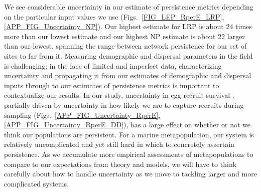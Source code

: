 \documentclass[12pt, oneside]{article}   	%
\begin{document}
We see considerable uncertainty in our estimate of persistence metrics depending on the particular input values we use (Figs.\ \ref{FIG_LEP_RperE_LRP}, \ref{APP_FIG_Uncertainty_NP}). Our highest estimate for LRP is about 24 times more than our lowest estimate and our highest NP estimate is about 22 larger than our lowest, spanning the range between network persistence for our set of sites to far from it. Measuring demographic and dispersal parameters in the field is challenging; in the face of limited and imperfect data, characterizing uncertainty and propagating it from our estimates of demographic and dispersal inputs through to our estimates of persistence metrics is important to contextualize our results. In our study, uncertainty in egg-recruit survival \citep[a commonly challenging parameter to estimate, e.g.][]{johnson2018integrating,hameed2016inverse}, partially driven by uncertainty in how likely we are to capture recruits during sampling (Figs.\ \ref{APP_FIG_Uncertainty_RperE}, \ref{APP_FIG_Uncertainty_RperE_DD}), has a large effect on whether or not we think our populations are persistent. For a marine metapopulation, our system is relatively uncomplicated and yet still hard in which to concretely assertain persistence. As we accumulate more empirical assessments of metapopulations to compare to our expectations from theory and models, we will have to think carefully about how to handle uncertainty as we move to tackling larger and more complicated systems. %

\end{document}
